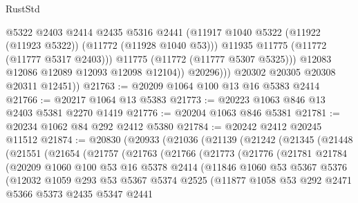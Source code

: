 \begin{lexlean}{RustStd}
\begin{coremodule}
                      @5322
                      @2403
                      @2414
                      @2435
                      @5316
                      @2441
                      (@11917 @1040 @5322 (@11922 (@11923 @5322)) (@11772 (@11928 @1040 @53)))
                      @11935
                      @11775
                      (@11772 (@11777 @5317 @2403)))
                    @11775
                    (@11772 (@11777 @5307 @5325)))
                  @12083
                  @12086
                  @12089
                  @12093
                  @12098
                  @12104))
              @20296)))
        @20302
        @20305
        @20308
        @20311
        @12451))
@21763 := @20209 @1064 @100 @13 @16 @5383 @2414
@21766 := @20217 @1064 @13 @5383
@21773 := @20223 @1063 @846 @13 @2403 @5381 @2270 @1419
@21776 := @20204 @1063 @846 @5381
@21781 := @20234 @1062 @84 @292 @2412 @5380
@21784 := @20242 @2412 @20245 @11512
@21874 := @20830
    (@20933
      (@21036
        (@21139
          (@21242
            (@21345
              (@21448
                (@21551
                  (@21654
                    (@21757
                      (@21763
                        (@21766
                          (@21773
                            (@21776
                              (@21781
                                @21784
                                (@20209
                                  @1060
                                  @100
                                  @53
                                  @16
                                  @5378
                                  @2414
                                  (@11846
                                    @1060
                                    @53
                                    @5367
                                    @5376
                                    (@12032
                                      @1059
                                      @293
                                      @53
                                      @5367
                                      @5374
                                      @2525
                                      (@11877
                                        @1058
                                        @53
                                        @292
                                        @2471
                                        @5366
                                        @5373
                                        @2435
                                        @5347
                                        @2441

\end{coremodule}
\end{lexlean}
